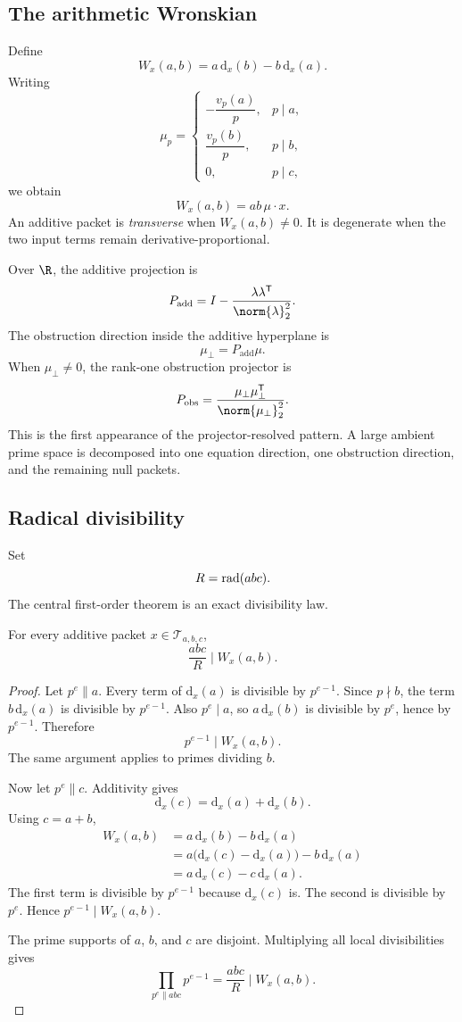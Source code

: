 \subsection{The arithmetic Wronskian}
Define
\[
 \boxed{
 W_x(a,b)
 =a\,\mathrm d_x(b)-b\,\mathrm d_x(a).
 }
\]
Writing
\[
 \mu_p=
 \begin{cases}
 -\dfrac{v_p(a)}p,&p\mid a,\\[6pt]
 \dfrac{v_p(b)}p,&p\mid b,\\[6pt]
 0,&p\mid c,
 \end{cases}
\]
we obtain
\[
 W_x(a,b)=ab\,\mu\cdot x.
\]
An additive packet is \emph{transverse} when $W_x(a,b)\neq0$. It is degenerate when the two input terms remain derivative-proportional.

Over $\R$, the additive projection is
\[
 P_{\mathrm{add}}
 =
 I-
 \frac{\lambda\lambda^{\mathsf T}}{\norm{\lambda}_2^2}.
\]
The obstruction direction inside the additive hyperplane is
\[
 \mu_\perp=P_{\mathrm{add}}\mu.
\]
When $\mu_\perp\neq0$, the rank-one obstruction projector is
\[
 P_{\mathrm{obs}}
 =
 \frac{\mu_\perp\mu_\perp^{\mathsf T}}
 {\norm{\mu_\perp}_2^2}.
\]
This is the first appearance of the projector-resolved pattern. A large ambient prime space is decomposed into one equation direction, one obstruction direction, and the remaining null packets.

\subsection{Radical divisibility}
Set
\[
 R=\operatorname{rad}(abc).
\]
The central first-order theorem is an exact divisibility law.

\begin{theorem}
For every additive packet $x\in\mathcal T_{a,b,c}$,
\[
 \boxed{
 \frac{abc}{R}\mid W_x(a,b).
 }
\]
\end{theorem}

\begin{proof}
Let $p^e\parallel a$. Every term of $\mathrm d_x(a)$ is divisible by $p^{e-1}$. Since $p\nmid b$, the term $b\,\mathrm d_x(a)$ is divisible by $p^{e-1}$. Also $p^e\mid a$, so $a\,\mathrm d_x(b)$ is divisible by $p^e$, hence by $p^{e-1}$. Therefore
\[
 p^{e-1}\mid W_x(a,b).
\]
The same argument applies to primes dividing $b$.

Now let $p^e\parallel c$. Additivity gives
\[
 \mathrm d_x(c)=\mathrm d_x(a)+\mathrm d_x(b).
\]
Using $c=a+b$,
\[
 \begin{aligned}
 W_x(a,b)
 &=a\,\mathrm d_x(b)-b\,\mathrm d_x(a)\\
 &=a\bigl(\mathrm d_x(c)-\mathrm d_x(a)\bigr)-b\,\mathrm d_x(a)\\
 &=a\,\mathrm d_x(c)-c\,\mathrm d_x(a).
 \end{aligned}
\]
The first term is divisible by $p^{e-1}$ because $\mathrm d_x(c)$ is. The second is divisible by $p^e$. Hence $p^{e-1}\mid W_x(a,b)$.

The prime supports of $a$, $b$, and $c$ are disjoint. Multiplying all local divisibilities gives
\[
 \prod_{p^e\parallel abc}p^{e-1}
 =
 \frac{abc}{R}
 \mid W_x(a,b).
\]
\end{proof}

